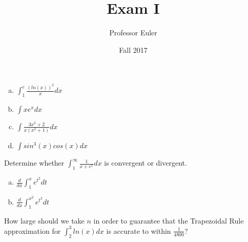\documentclass{neu_exam}
\author{Professor Euler}
\title{Exam I}
\date{Fall 2017}
\begin{document}
\begin{ProblemDefinition}

	\begin{enumerate}[a)]

		\item $\int_1^e{ \frac{ (ln(x))^2 }{ x } dx }$

		\vspace{10.0cm}
		\item{$\int{ x e^x dx }$}

		\newpage

		\item{$\int{ \frac{ 3x^2 + 2 }{ x( x^2 + 1 ) } dx }$}
		
		\vspace{10.0cm}
		\item{$\int{ sin^3(x) cos(x) dx }$}

	\end{enumerate}

\end{ProblemDefinition}


\begin{ProblemDefinition}

	Determine whether $ \int_1^\infty{ \frac{ 1 }{ x + e^x } dx } $ is convergent or divergent.

\end{ProblemDefinition}


\begin{ProblemDefinition}[Find:]

	\begin{enumerate}[a)]
	
		\item $ \frac{d}{dx} \int_1^x{ e^{ t^2 } dt } $
	
		\vspace{10.0cm}
		\item $ \frac{d}{dx} \int_1^{x^2}{ e^{ t^2 } dt } $
	
	\end{enumerate}

\end{ProblemDefinition}

\begin{ProblemDefinition}

	How large should we take $n$ in order to guarantee that the Trapezoidal Rule approximation for $ \int_2^3{ ln(x) dx } $ is accurate to within $\frac{1}{4800}$?

\end{ProblemDefinition}

\end{document}
